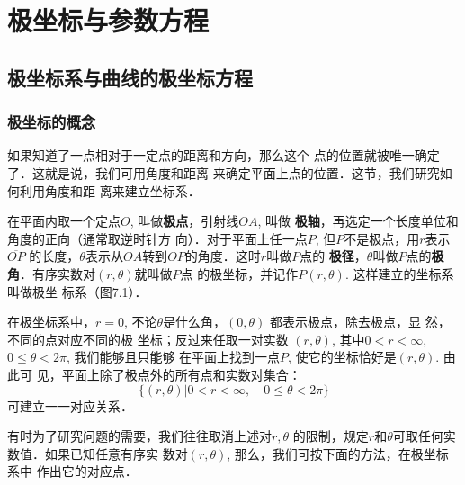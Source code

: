 
\chapter{极坐标与参数方程}

\section{极坐标系与曲线的极坐标方程}
\subsection{极坐标的概念}

如果知道了一点相对于一定点的距离和方向，那么这个
点的位置就被唯一确定了．这就是说，我们可用角度和距离
来确定平面上点的位置．这节，我们研究如何利用角度和距
离来建立坐标系．

在平面内取一个定点$O$, 叫做\textbf{极点}，引射线$OA$, 叫做
\textbf{极轴}，再选定一个长度单位和角度的正向（通常取逆时针方
向）．对于平面上任一点$P$, 但$P$不是极点，用$r$表示$\overline{OP}$
的长度，$\theta$表示从$OA$转到$OP$的角度．这时$r$叫做$P$点的
\textbf{极径}，$\theta$叫做$P$点的\textbf{极角}．有序实数对$(r,\theta)$就叫做$P$点
的极坐标，并记作$P(r,\theta)$. 这样建立的坐标系叫做极坐
标系（图7.1）．

在极坐标系中，$r=0$,
不论$\theta$是什么角，$(0,\theta)$
都表示极点，除去极点，显
然，不同的点对应不同的极
坐标；反过来任取一对实数
$(r,\theta)$, 其中$0<r<\infty$, $0\le\theta<2\pi$, 我们能够且只能够
在平面上找到一点$P$, 使它的坐标恰好是$(r,\theta)$. 由此可
见，平面上除了极点外的所有点和实数对集合：
\[\{(r,\theta)|0<r<\infty,\quad 0\le\theta<2\pi\}\]
可建立一一对应关系．

有时为了研究问题的需要，我们往往取消上述对$r,\theta$
的限制，规定$r$和$\theta$可取任何实数值．如果已知任意有序实
数对$(r,\theta)$, 那么，我们可按下面的方法，在极坐标系中
作出它的对应点．

\begin{figure}[htp]\centering
    \begin{minipage}[t]{0.48\textwidth}
    \centering
{}
    \caption{}
    \end{minipage}
    \begin{minipage}[t]{0.48\textwidth}
    \centering
    \caption{}
    \end{minipage}
    \end{figure}


